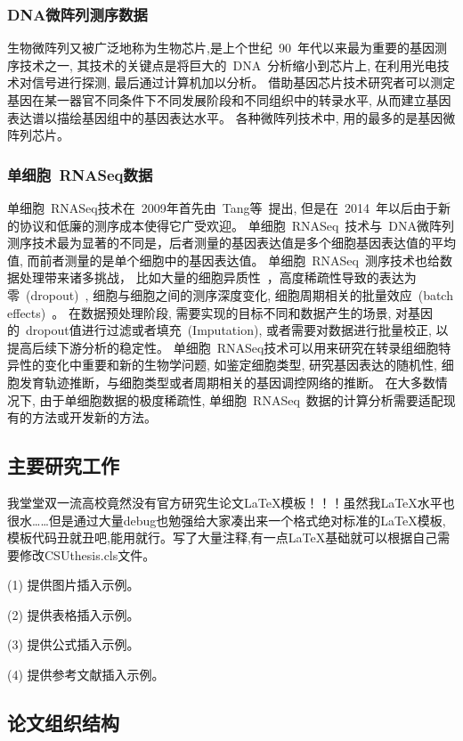 \subsubsection{DNA微阵列测序数据}
生物微阵列又被广泛地称为生物芯片,是上个世纪~90~年代以来最为重要的基因测序技术之一,
其技术的关键点是将巨大的~DNA~分析缩小到芯片上, 在利用光电技术对信号进行探测, 最后通过计算机加以分析。
借助基因芯片技术研究者可以测定基因在某一器官不同条件下不同发展阶段和不同组织中的转录水平,
从而建立基因表达谱以描绘基因组中的基因表达水平。
各种微阵列技术中, 用的最多的是基因微阵列芯片。

\subsubsection{单细胞~RNASeq数据}
单细胞~RNASeq技术在~2009年首先由~Tang等~\cite{tang2009mrna}提出,
但是在~2014~年以后由于新的协议和低廉的测序成本使得它广受欢迎。
单细胞~RNASeq~技术与~DNA微阵列测序技术最为显著的不同是，后者测量的基因表达值是多个细胞基因表达值的平均值,
而前者测量的是单个细胞中的基因表达值。
单细胞~RNASeq~测序技术也给数据处理带来诸多挑战，
比如大量的细胞异质性~\cite{wagner2016revealing}，高度稀疏性导致的表达为零~(dropout)~\cite{kharchenko2014bayesian}, 细胞与细胞之间的测序深度变化, 细胞周期相关的批量效应~(batch effects)~\cite{buettner2015computational}。
在数据预处理阶段, 需要实现的目标不同和数据产生的场景, 对基因的~dropout值进行过滤或者填充~(Imputation), 或者需要对数据进行批量校正, 以提高后续下游分析的稳定性。
单细胞~RNASeq技术可以用来研究在转录组细胞特异性的变化中重要和新的生物学问题,
如鉴定细胞类型, 研究基因表达的随机性, 细胞发育轨迹推断，与细胞类型或者周期相关的基因调控网络的推断。
在大多数情况下, 由于单细胞数据的极度稀疏性, 单细胞~RNASeq~数据的计算分析需要适配现有的方法或开发新的方法。


\subsection{主要研究工作}
我堂堂双一流高校竟然没有官方研究生论文LaTeX模板！！！虽然我LaTeX水平也很水……但是通过大量debug也勉强给大家凑出来一个格式绝对标准的LaTeX模板,模板代码丑就丑吧,能用就行。写了大量注释,有一点LaTeX基础就可以根据自己需要修改CSUthesis.cls文件。

(1) 提供图片插入示例。

(2) 提供表格插入示例。

(3) 提供公式插入示例。

(4) 提供参考文献插入示例。

\subsection{论文组织结构}

